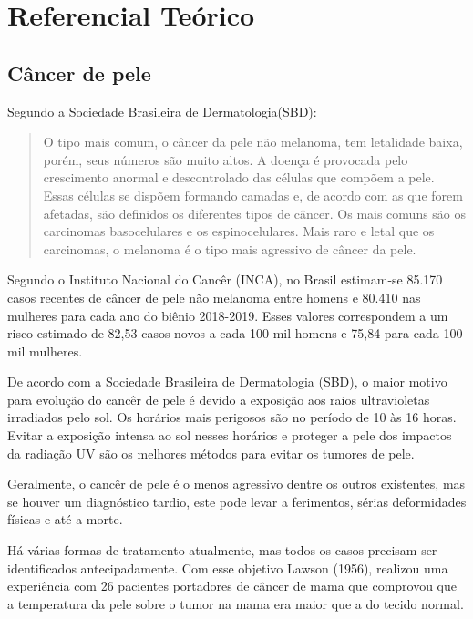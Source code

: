 

\chapter[Referencial Teórico]{Referencial Teórico}

\section{Câncer de pele}
    Segundo a Sociedade Brasileira de Dermatologia(SBD):

\begin{quotation}
    	O tipo  mais comum, o câncer da pele não melanoma, tem letalidade baixa, porém, seus números são muito altos. A doença é provocada pelo crescimento anormal e descontrolado das células que compõem a pele. Essas células se dispõem formando camadas e, de acordo com as que forem afetadas, são definidos os diferentes tipos de câncer. Os mais comuns são os carcinomas basocelulares e os espinocelulares. Mais raro e letal que os carcinomas, o melanoma é o tipo mais agressivo de câncer da pele.\cite{INMETRO}
\end{quotation}
               
    Segundo o Instituto Nacional do Cancêr (INCA), no Brasil estimam-se 85.170 casos recentes de câncer de pele não melanoma entre homens e 80.410 nas mulheres para cada ano do biênio 2018-2019. Esses valores correspondem a um risco estimado de 82,53 casos novos a cada 100 mil homens e 75,84 para cada 100 mil mulheres. %
              
    De acordo com a Sociedade Brasileira de Dermatologia (SBD), o maior motivo para evolução do cancêr de pele é devido a exposição aos raios ultravioletas irradiados pelo sol. Os horários mais perigosos são no período de 10 às 16 horas. Evitar a exposição intensa ao sol nesses horários e proteger a pele dos impactos da radiação UV são os melhores métodos para evitar os tumores de pele.%

 Geralmente, o cancêr de pele é o menos agressivo dentre os outros existentes, mas se houver um diagnóstico tardio, este pode levar a ferimentos, sérias deformidades físicas e até a morte.


 Há várias formas de tratamento atualmente, mas todos os casos precisam ser identificados antecipadamente. Com esse objetivo Lawson (1956), realizou uma experiência com 26 pacientes portadores de câncer de mama que comprovou que a temperatura da pele sobre o tumor na mama era maior que a do tecido normal.%


